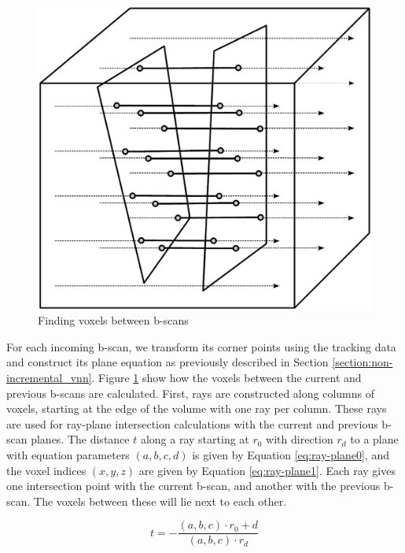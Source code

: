 	\begin{figure}[h]
	\centering
	\includegraphics[height=0.4\textheight]{graphics/trace_intersections.png}
	\caption{Finding voxels between b-scans}
	\label{fig:trace_intersections}
	\end{figure}

For each incoming b-scan, we transform its corner points using the tracking data and construct its plane equation as previously described in Section \ref{section:non-incremental_vnn}. Figure \ref{fig:trace_intersections} show how the voxels between the current and previous b-scans are calculated. First, rays are constructed along columns of voxels, starting at the edge of the volume with one ray per column. These rays are used for ray-plane intersection calculations with the current and previous b-scan planes. The distance $t$ along a ray starting at $r_0$ with direction $r_d$ to a plane with equation parameters $(a,b,c,d)$ is given by Equation \ref{eq:ray-plane0}, and the voxel indices $(x,y,z)$ are given by Equation \ref{eq:ray-plane1}. Each ray gives one intersection point with the current b-scan, and another with the previous b-scan. The voxels between these will lie next to each other.

\begin{equation}
	\label{eq:ray-plane0}
	t = -\frac{(a,b,c) \cdot r_0 + d}{(a,b,c) \cdot r_d}
\end{equation}

